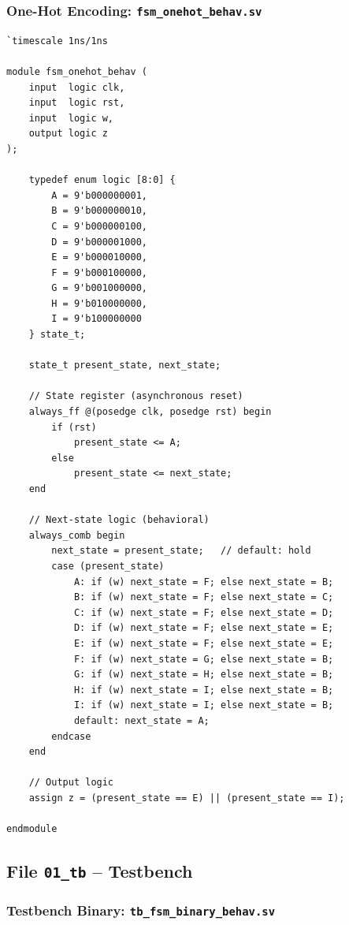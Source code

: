 \documentclass[12pt, a4paper]{article}
\begin{document}
\subsubsection{One-Hot Encoding: \texttt{fsm\_onehot\_behav.sv}}

\begin{lstlisting}[caption={\texttt{00\_src/fsm\_onehot\_behav.sv} -- One-Hot Encoding, Behavioral Style.},
                   label={lst:exp4-onehot}]
`timescale 1ns/1ns

module fsm_onehot_behav (
    input  logic clk,
    input  logic rst,
    input  logic w,
    output logic z
);

    typedef enum logic [8:0] {
        A = 9'b000000001,
        B = 9'b000000010,
        C = 9'b000000100,
        D = 9'b000001000,
        E = 9'b000010000,
        F = 9'b000100000,
        G = 9'b001000000,
        H = 9'b010000000,
        I = 9'b100000000
    } state_t;

    state_t present_state, next_state;

    // State register (asynchronous reset)
    always_ff @(posedge clk, posedge rst) begin
        if (rst)
            present_state <= A;
        else
            present_state <= next_state;
    end

    // Next-state logic (behavioral)
    always_comb begin
        next_state = present_state;   // default: hold
        case (present_state)
            A: if (w) next_state = F; else next_state = B;
            B: if (w) next_state = F; else next_state = C;
            C: if (w) next_state = F; else next_state = D;
            D: if (w) next_state = F; else next_state = E;
            E: if (w) next_state = F; else next_state = E;
            F: if (w) next_state = G; else next_state = B;
            G: if (w) next_state = H; else next_state = B;
            H: if (w) next_state = I; else next_state = B;
            I: if (w) next_state = I; else next_state = B;
            default: next_state = A;
        endcase
    end

    // Output logic
    assign z = (present_state == E) || (present_state == I);

endmodule
\end{lstlisting}

\subsection{File \texttt{01\_tb} -- Testbench}
\label{subsec:exp4-tb}

\subsubsection{Testbench Binary: \texttt{tb\_fsm\_binary\_behav.sv}}
\end{document}
